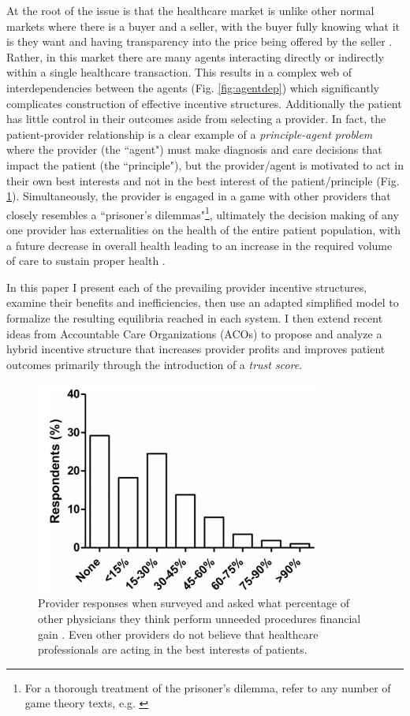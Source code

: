 \documentclass{article}
\begin{document}
At the root of the issue is that the healthcare market is unlike other normal markets where there is a buyer and a seller, with the buyer fully knowing what it is they want and having transparency into the price being offered by the seller \cite{msdt}. Rather, in this market there are many agents interacting directly or indirectly within a single healthcare transaction. This results in a complex web of interdependencies between the agents (Fig. \ref{fig:agentdep}) which significantly complicates construction of effective incentive structures. Additionally the patient has little control in their outcomes aside from selecting a provider. In fact, the patient-provider relationship is a clear example of a \emph{principle-agent problem} \cite{principle} where the provider (the ``agent") must make diagnosis and care decisions that impact the patient (the ``principle"), but the provider/agent is motivated to act in their own best interests and not in the best interest of the patient/principle \cite{msdt} (Fig. \ref{fig:overtreat}). Simultaneously, the provider is engaged in a game with other providers that closely resembles a ``prisoner's dilemmas"\footnote{For a thorough treatment of the prisoner's dilemma, refer to any number of game theory texts, e.g. \cite{networks}}, ultimately the decision making of any one provider has externalities on the health of the entire patient population, with a future decrease in overall health leading to an increase in the required volume of care to sustain proper health \cite{blended}.

In this paper I present each of the prevailing provider incentive structures, examine their benefits and inefficiencies, then use an adapted simplified model to formalize the resulting equilibria reached in each system. I then extend recent ideas from Accountable Care Organizations (ACOs) to propose and analyze a hybrid incentive structure that increases provider profits and improves patient outcomes primarily through the introduction of a \emph{trust score}.

\begin{figure}[H]
\includegraphics[height=7cm]{overtreat}
\centering
\caption{Provider responses when surveyed and asked what percentage of other physicians they think perform unneeded procedures financial gain \cite{overtreat}. Even other providers do not believe that healthcare professionals are acting in the best interests of patients.}
\label{fig:overtreat}
\end{figure}
\end{document}

